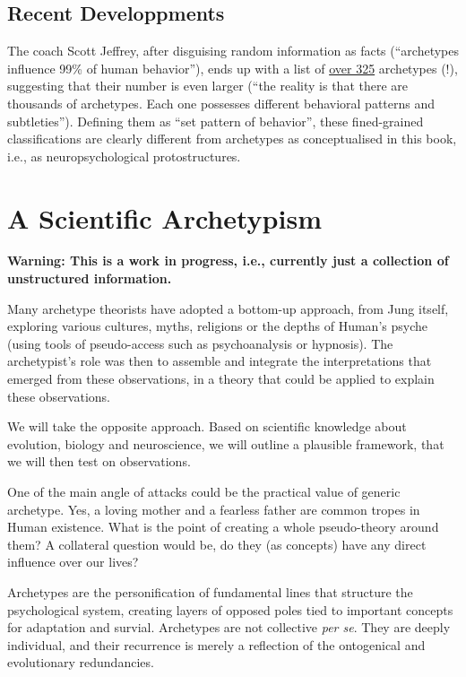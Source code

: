 \documentclass[]{book}
\begin{document}
\hypertarget{recent-developpments}{%
\section{Recent Developpments}\label{recent-developpments}}

The coach Scott Jeffrey, after disguising random information as facts (``archetypes influence 99\% of human behavior''), ends up with a list of \href{https://scottjeffrey.com/archetypes-list/}{over 325} archetypes (!), suggesting that their number is even larger (``the reality is that there are thousands of archetypes. Each one possesses different behavioral patterns and subtleties''). Defining them as ``set pattern of behavior'', these fined-grained classifications are clearly different from archetypes as conceptualised in this book, i.e., as neuropsychological protostructures.

\hypertarget{a-scientific-archetypism}{%
\chapter{A Scientific Archetypism}\label{a-scientific-archetypism}}

\textbf{Warning: This is a work in progress, i.e., currently just a collection of unstructured information.}

Many archetype theorists have adopted a bottom-up approach, from Jung itself, exploring various cultures, myths, religions or the depths of Human's psyche (using tools of pseudo-access such as psychoanalysis or hypnosis). The archetypist's role was then to assemble and integrate the interpretations that emerged from these observations, in a theory that could be applied to explain these observations.

We will take the opposite approach. Based on scientific knowledge about evolution, biology and neuroscience, we will outline a plausible framework, that we will then test on observations.

One of the main angle of attacks could be the practical value of generic archetype. Yes, a loving mother and a fearless father are common tropes in Human existence. What is the point of creating a whole pseudo-theory around them? A collateral question would be, do they (as concepts) have any direct influence over our lives?

Archetypes are the personification of fundamental lines that structure the psychological system, creating layers of opposed poles tied to important concepts for adaptation and survial. Archetypes are not collective \emph{per se}. They are deeply individual, and their recurrence is merely a reflection of the ontogenical and evolutionary redundancies.
\end{document}
